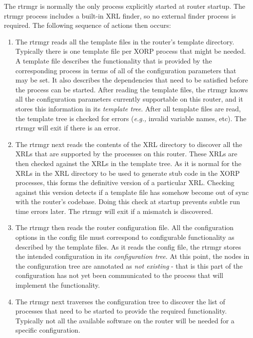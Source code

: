 \documentclass[11pt]{article}
\newcommand{\eg}{\emph{e.g.,}\xspace}
\begin{document}
The rtrmgr is normally the only process explicitly started at router
startup.  The rtrmgr process includes a built-in XRL finder, so no
external finder process is required.  The following sequence of
actions then occurs:

\begin{enumerate}

  \item The rtrmgr reads all the template files in the router's template
  directory.  Typically there is one template file per XORP process that
  might be needed.  A template file describes the functionality that is
  provided by the corresponding process in terms of all of the
  configuration parameters that may be set.  It also describes the
  dependencies that need to be satisfied before the process can be
  started.  After reading the template files, the rtrmgr knows all the
  configuration parameters currently supportable on this router, and it
  stores this information in its \textit{template tree}.
  After all template files are read, the template tree is checked for
  errors (\eg invalid variable names, etc). The rtrmgr will exit
  if there is an error.

  \item The rtrmgr next reads the contents of the XRL directory to discover
  all the XRLs that are supported by the processes on this router.
  These XRLs are then checked against the XRLs in the template tree.  As
  it is normal for the XRLs in the XRL directory to be used to generate
  stub code in the XORP processes, this forms the definitive version of
  a particular XRL.  Checking against this version detects if a template
  file has somehow become out of sync with the router's codebase.  Doing
  this check at startup prevents subtle run time errors later.  The
  rtrmgr will exit if a mismatch is discovered.

  \item The rtrmgr then reads the router configuration file.  All the
  configuration options in the config file must correspond to
  configurable functionality as described by the template files.  As it
  reads the config file, the rtrmgr stores the intended configuration in
  its \textit{configuration tree}.  At this point, the nodes in the
  configuration tree are annotated as \textit{not existing} - that is
  this part of the configuration has not yet been communicated to the
  process that will implement the functionality.

  \item The rtrmgr next traverses the configuration tree to discover the list
  of processes that need to be started to provide the required
  functionality.  Typically not all the available software on the router
  will be needed for a specific configuration.


\end{enumerate}
\end{document}

